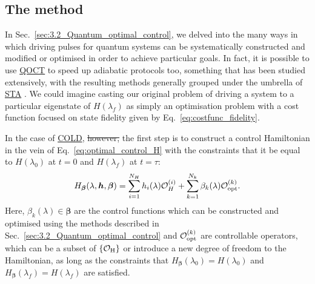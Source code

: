 \documentclass[a4paper,oneside,11pt]{book}
\newcommand{\betabb}{\boldsymbol{\beta}}
\newcommand{\hbb}{\boldsymbol{h}}
\newcommand{\acrref}[1]{\hyperref[acr:#1]{#1}}
\providecommand{\DIFaddtex}[1]{{\protect\color{blue}\uwave{#1}}} %
\providecommand{\DIFdeltex}[1]{{\protect\color{red}\sout{#1}}}                      %
\providecommand{\DIFaddbegin}{} %
\providecommand{\DIFaddend}{} %
\providecommand{\DIFdelbegin}{} %
\providecommand{\DIFdelend}{} %
\providecommand{\DIFadd}[1]{\texorpdfstring{\DIFaddtex{#1}}{#1}} %
\providecommand{\DIFdel}[1]{\texorpdfstring{\DIFdeltex{#1}}{}} %
\newcommand{\DIFscaledelfig}{0.5}
\newlength{\DIFdelgraphicswidth} %
\newlength{\DIFdelgraphicsheight} %
\newcommand{\DIFaddincludegraphics}[2][]{{\color{blue}\fbox{\DIFOincludegraphics[#1]{#2}}}} %
\newcommand{\DIFdelincludegraphics}[2][]{%
\sbox{\DIFdelgraphicsbox}{\DIFOincludegraphics[#1]{#2}}%
\settoboxwidth{\DIFdelgraphicswidth}{\DIFdelgraphicsbox} %
\settoboxtotalheight{\DIFdelgraphicsheight}{\DIFdelgraphicsbox} %
\scalebox{\DIFscaledelfig}{%
\parbox[b]{\DIFdelgraphicswidth}{\usebox{\DIFdelgraphicsbox}\\[-\baselineskip] \rule{\DIFdelgraphicswidth}{0em}}\llap{\resizebox{\DIFdelgraphicswidth}{\DIFdelgraphicsheight}{%
\setlength{\unitlength}{\DIFdelgraphicswidth}%
\begin{picture}(1,1)%
\thicklines\linethickness{2pt} %
{\color[rgb]{1,0,0}\put(0,0){\framebox(1,1){}}}%
{\color[rgb]{1,0,0}\put(0,0){\line( 1,1){1}}}%
{\color[rgb]{1,0,0}\put(0,1){\line(1,-1){1}}}%
\end{picture}%
}\hspace*{3pt}}} %
} %
\DeclareRobustCommand{\DIFaddbegin}{\DIFOaddbegin \let\includegraphics\DIFaddincludegraphics} %
\DeclareRobustCommand{\DIFaddend}{\DIFOaddend \let\includegraphics\DIFOincludegraphics} %
\DeclareRobustCommand{\DIFdelbegin}{\DIFOdelbegin \let\includegraphics\DIFdelincludegraphics} %
\DeclareRobustCommand{\DIFdelend}{\DIFOaddend \let\includegraphics\DIFOincludegraphics} %
\begin{document}
\subsection{The method}

In Sec.~\ref{sec:3.2_Quantum_optimal_control}, we delved into the many ways in which driving pulses for quantum systems can be systematically constructed and modified or optimised in order to achieve particular goals. In fact, it is possible to use \acrref{QOCT} to speed up adiabatic protocols too, something that has been studied extensively, with the resulting methods generally grouped under the umbrella of \acrref{STA} \cite{guery-odelin_shortcuts_2019, torrontegui_chapter_2013}. We could imagine casting our original problem of driving a system to a particular eigenstate of $H(\lambda_f)$ as simply an optimisation problem with a cost function focused on state fidelity given by Eq.~\eqref{eq:costfunc_fidelity}. 

In the case of \acrref{COLD}, \DIFdelbegin \DIFdel{however, }\DIFdelend the first step is to construct a control Hamiltonian in the vein of Eq.~\eqref{eq:optimal_control_H} with the constraints that it be equal to $H(\lambda_0)$ at $t=0$ and $H(\lambda_f)$ at $t=\tau$:
\begin{equation}\label{eq:COLD_optimal_control}
    H_{\betabb}(\lambda, \hbb, \betabb) = \sum_{i = 1}^{N_H} h_i(\lambda) \mathcal{O}_H^{(i)} + \sum_{k = 1}^{N_k} \beta_k(\lambda) \mathcal{O}_{\rm opt}^{(k)}.
\end{equation}
Here, $\beta_k(\lambda) \in \betabb$ are the control functions which can be constructed and optimised using the methods described in Sec.~\ref{sec:3.2_Quantum_optimal_control} and \DIFdelbegin \DIFdel{$\mathcal{O}_{\rm opt}^{(k)}$ }\DIFdelend \DIFaddbegin \DIFadd{$\{\mathcal{O}_{\rm opt}^{(k)}\}_{k = 1, ..., N_k}$ }\DIFaddend are controllable operators, which can be a subset of \DIFdelbegin \DIFdel{$\{\mathcal{O}_{\rm H}\}$ }\DIFdelend \DIFaddbegin \DIFadd{$\mathcal{O}_{\rm H}$ }\DIFaddend or introduce a new degree of freedom to the Hamiltonian, as long as the constraints that $H_{\betabb}(\lambda_0) = H(\lambda_0)$ and $H_{\betabb}(\lambda_f) = H(\lambda_f)$ are satisfied. 
\end{document}
